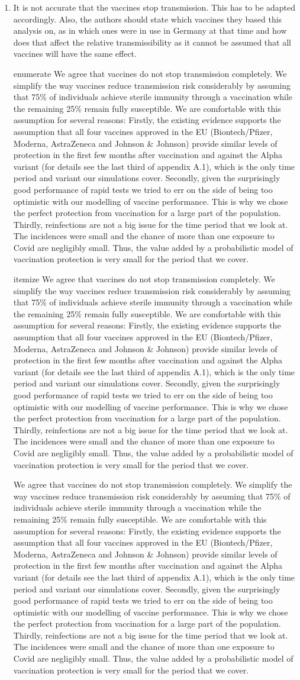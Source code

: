 \documentclass[a4paper,11pt]{article}
\makeatletter
\theoremstyle{plain}
\newlength{\parindentaux}
\newcommand*\@myenumerate{enumerate}
\newcommand*\@myitemize{itemize}
\newcommand{\response}[1]{{%
		\color{black}%
		\par\frenchspacing%
		\ifx\@currenvir\@myenumerate%
		\addtolength{\leftskip}{-\parindentaux}%
		\rm\noindent #1\par%
		\addtolength{\leftskip}{\parindentaux}%
		\else%
		\ifx\@currenvir\@myitemize%
		\addtolength{\leftskip}{-\parindentaux}%
		\rm\noindent #1\par%
		\addtolength{\leftskip}{\parindentaux}%
		\else%
		\rm\noindent #1\par%
		\fi%
		\fi%
}}
\makeatother
\begin{document}
{\begin{enumerate}
          \response{%
              We now cite our main reference for the susceptibilities for each age group also in the main text. We directly take the susceptibilities given by Davies et al. 2020, in their Extended Data Fig. 4.
              We base our assumption on infectiousness being independent of age on Jones et al. 2021. They report only slight differences in viral loads between German adults and children: ``The least infectious youngest children have 78\% (61, 94) of the peak culture probability of adults aged 45 to 55''. Furthermore, they caution that these lower numbers may be due to different sample taking - such as the usage of smaller pediatric swab devices - rather than actual lower viral loads and conclude that the differences, if existent, are likely not clinically relevant.
          }
    \item It is not accurate that the vaccines stop transmission. This has to be adapted accordingly. Also, the authors should state which vaccines they based this analysis on, as in which ones were in use in Germany at that time and how does that affect the relative transmissibility as it cannot be assumed that all vaccines will have the same effect.
          \response{%
              We agree that vaccines do not stop transmission completely. We simplify the way vaccines reduce transmission risk considerably by assuming that 75\% of individuals achieve sterile immunity through a vaccination while the remaining 25\% remain fully susceptible. We are comfortable with this assumption for several reasons:
              Firstly, the existing evidence supports the assumption that all four vaccines approved in the EU (Biontech/Pfizer, Moderna, AstraZeneca and Johnson \& Johnson) provide similar levels of protection in the first few months after vaccination and against the Alpha variant (for details see the last third of appendix A.1), which is the only time period and variant our simulations cover.
              Secondly, given the surprisingly good performance of rapid tests we tried to err on the side of being too optimistic with our modelling of vaccine performance. This is  why we chose the perfect protection from vaccination for a large part of the population.
              Thirdly, reinfections are not a big issue for the time period that we look at. The incidences were small and the chance of more than one exposure to Covid are negligibly small. Thus, the value added by a probabilistic model of vaccination protection is very small for the period that we cover.
          }
\end{enumerate}
}


% 
% 
\end{document}
